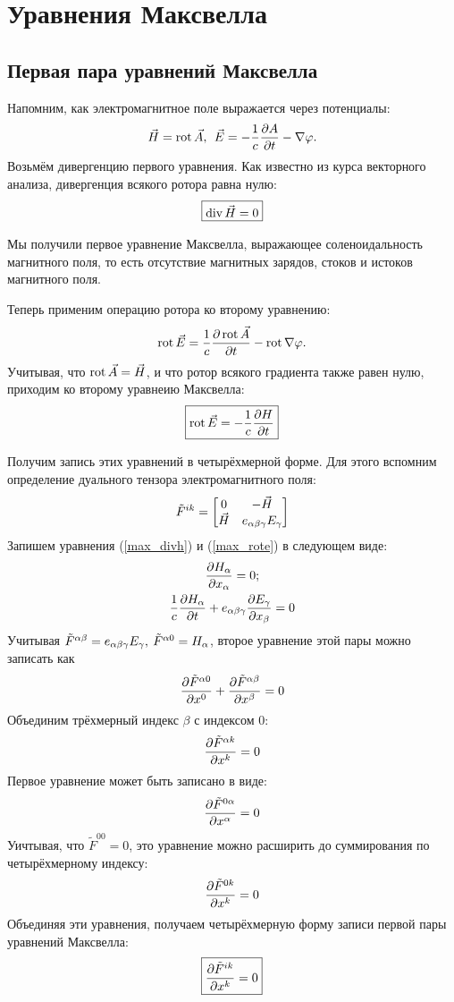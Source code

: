 \newpage
\section{Уравнения Максвелла}
\subsection{Первая пара уравнений Максвелла}
    Напомним, как электромагнитное поле выражается через потенциалы:
    \[
        \vec{H} = \operatorname{rot} \vec{A}, \:\: \vec{E} = - \frac1c\frac{\partial A}{\partial t} - \nabla\varphi.
    \]
    Возьмём дивергенцию первого уравнения. Как известно из курса векторного анализа, дивергенция всякого ротора равна нулю:
    \begin{equation}
        \boxed{\operatorname{div}\vec{H} = 0} \label{max_divh}
    \end{equation}
    
    Мы получили первое уравнение Максвелла, выражающее соленоидальность магнитного поля, то есть отсутствие магнитных зарядов, стоков и истоков магнитного поля.
    
    Теперь применим операцию ротора ко второму уравнению:
    \[
        \operatorname{rot} \vec{E} = \frac 1c \frac{\partial\operatorname{rot}\vec{A}}{\partial t} - \operatorname{rot}\nabla\varphi.
    \]
    Учитывая, что $\operatorname{rot}\vec{A} = \vec{H}$, и что ротор всякого градиента также равен нулю, приходим ко второму уравнеию Максвелла:
    \begin{equation}
        \boxed{\operatorname{rot}{\vec{E}} = -\frac 1c \frac{\partial H}{\partial t}} \label{max_rote}
    \end{equation}

    Получим запись этих уравнений в четырёхмерной форме. Для этого вспомним определение дуального тензора электромагнитного поля:
    \[
        \tilde{F}^{ik} = \begin{bmatrix}
            0 & -\vec{H} \\
            \vec{H} & e_{\alpha\beta\gamma} E_{\gamma}
        \end{bmatrix}
    \]
    Запишем уравнения (\ref{max_divh}) и (\ref{max_rote}) в следующем виде:
    \begin{gather*}
        \frac{\partial H_{\alpha}}{\partial x_{\alpha}} = 0; \\
        \frac 1c \frac{\partial H_{\alpha}}{\partial t} + e_{\alpha\beta\gamma} \frac{\partial E_{\gamma}}{\partial x_{\beta}} = 0
    \end{gather*}
    Учитывая $\tilde{F}^{\alpha\beta} = e_{\alpha\beta\gamma} E_{\gamma}, \: \tilde{F}^{\alpha 0} = H_{\alpha}$, второе уравнение этой пары можно записать как
    \begin{gather*}
        \frac{\partial\tilde{F}^{\alpha 0}}{\partial x^0} + \frac{\partial\tilde{F}^{\alpha\beta}}{\partial x^\beta} = 0
    \end{gather*}
    Объединим трёхмерный индекс $\beta$ с индексом $0$:
    \[
        \frac{\partial\tilde{F}^{\alpha k}}{\partial x^k} = 0
    \]
    Первое уравнение может быть записано в виде:
    \[
        \frac{\partial\tilde{F}^{0 \alpha}}{\partial x^{\alpha}} = 0
    \]
    Уичтывая, что $\tilde{F}^{00} = 0$, это уравнение можно расширить до суммирования по четырёхмерному индексу:
    \[
        \frac{\partial\tilde{F}^{0k}}{\partial x^k} = 0
    \]
    Объединяя эти уравнения, получаем четырёхмерную форму записи первой пары уравнений Максвелла:
    \[
        \boxed{\frac{\partial\tilde{F}^{ik}}{\partial x^k} = 0}
    \]

